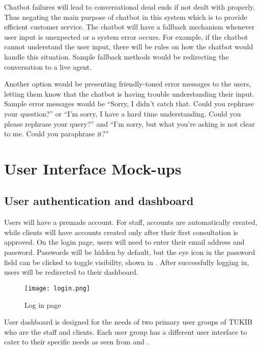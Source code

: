\begin{itemize}
	\subitem Chatbot failures will lead to conversational dead ends if not dealt with properly. Thus negating the main purpose of chatbot in this system which is to provide efficient customer service. The chatbot will have a fallback mechanism whenever user input is unexpected or a system error occurs. For example, if the chatbot cannot understand the user input, there will be rules on how the chatbot would handle this situation. Sample fallback methods would be redirecting the conversation to a live agent. 
	
	\subitem Another option would be presenting friendly-toned error messages to the users, letting them know that the chatbot is having trouble understanding their input. Sample error messages would be “Sorry, I didn't catch that. Could you rephrase your question?” or “I'm sorry, I have a hard time understanding. Could you please rephrase your query?” and “I'm sorry, but what you're asking is not clear to me. Could you paraphrase it?”
	
\end{itemize}


\section{User Interface Mock-ups}

\subsection{User authentication and dashboard}

Users will have a premade account. For staff, accounts are automatically created, while clients will have accounts created only after their first consultation is approved. On the login page, users will need to enter their email address and password. Passwords will be hidden by default, but the eye icon in the password field can be clicked to toggle visibility, shown in . After successfully logging in, users will be redirected to their dashboard.

\begin{figure}[h]
	\centering 
	\texttt{[image: login.png]}
	\caption{Log in page}
	\label{fig:login}
\end{figure}

User dashboard is designed for the needs of two primary user groups of TUKIB who are the staff and clients. Each user group has a different user interface to cater to their specific needs as seen from  and . 

